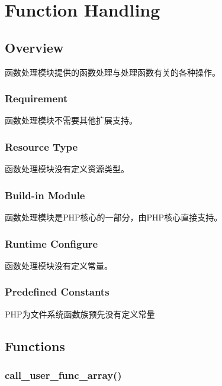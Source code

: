 \part{Function Handling}


\chapter{Overview}

函数处理模块提供的函数处理与处理函数有关的各种操作。


\section{Requirement}

函数处理模块不需要其他扩展支持。

\section{Resource Type}

函数处理模块没有定义资源类型。


\section{Build-in Module}

函数处理模块是PHP核心的一部分，由PHP核心直接支持。

\section{Runtime Configure}

函数处理模块没有定义常量。



\section{Predefined Constants}

PHP为文件系统函数族预先没有定义常量




\chapter{Functions}


\section{call\_user\_func\_array()}

